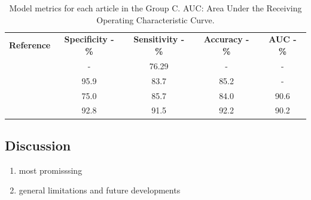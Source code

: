 \documentclass{article}
\begin{document}
\begin{table}[]
    \centering
    \begin{tabular}{ccccc}\toprule
        \multirow{2}{*}{\textbf{Reference}} & \multirow{2}{*}{\textbf{Specificity - \%}} & \multirow{2}{*}{\textbf{Sensitivity - \%}} & \multirow{2}{*}{\textbf{Accuracy - \%}} & \multirow{2}{*}{\textbf{AUC - \%}} \\
        \\\midrule
        \cite{Bi2017}                       & -                                          & 76.29                                      & -                                       & -                                  \\
        \cite{Bi2022}                       & 95.9                                       & 83.7                                       & 85.2                                    & -                                  \\
        \cite{Kong2022}                     & 75.0                                       & 85.7                                       & 84.0                                    & 90.6                               \\
        \cite{Zheng2020}                    & 92.8                                       & 91.5                                       & 92.2                                    & 90.2                               \\
        \bottomrule
    \end{tabular}
    \caption{Model metrics for each article in the Group C. AUC: Area Under the Receiving Operating Characteristic Curve.}
    \label{tab:res_C}
\end{table}

\subsection{Discussion}

\begin{enumerate}
    \item most promisssing
    \item general limitations and future developments
\end{enumerate}

\printbibliography
\end{document}
